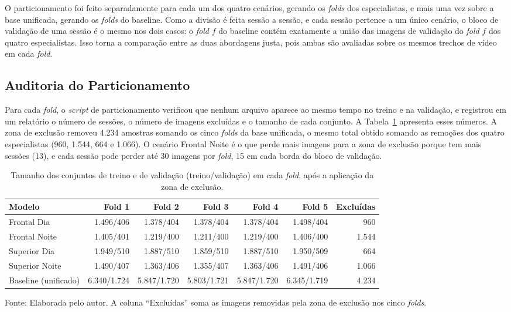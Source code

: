 O particionamento foi feito separadamente para cada um dos quatro cenários, gerando os \textit{folds} dos especialistas, e mais uma vez sobre a base unificada, gerando os \textit{folds} do baseline. Como a divisão é feita sessão a sessão, e cada sessão pertence a um único cenário, o bloco de validação de uma sessão é o mesmo nos dois casos: o \textit{fold} $f$ do baseline contém exatamente a união das imagens de validação do \textit{fold} $f$ dos quatro especialistas. Isso torna a comparação entre as duas abordagens justa, pois ambas são avaliadas sobre os mesmos trechos de vídeo em cada \textit{fold}.

\subsection{Auditoria do Particionamento}
\label{subsec:auditoria}

Para cada \textit{fold}, o \textit{script} de particionamento verificou que nenhum arquivo aparece ao mesmo tempo no treino e na validação, e registrou em um relatório o número de sessões, o número de imagens excluídas e o tamanho de cada conjunto. A Tabela~\ref{tab:auditoria-folds} apresenta esses números. A zona de exclusão removeu 4.234 amostras somando os cinco \textit{folds} da base unificada, o mesmo total obtido somando as remoções dos quatro especialistas (960, 1.544, 664 e 1.066). O cenário Frontal Noite é o que perde mais imagens para a zona de exclusão porque tem mais sessões (13), e cada sessão pode perder até 30 imagens por \textit{fold}, 15 em cada borda do bloco de validação.

\begin{table}[htb]
\centering
\caption{Tamanho dos conjuntos de treino e de validação (treino/validação) em cada \textit{fold}, após a aplicação da zona de exclusão.}
\label{tab:auditoria-folds}
\footnotesize
\setlength{\tabcolsep}{4pt}
\begin{tabular}{lrrrrrr}
\hline
\textbf{Modelo} & \textbf{Fold 1} & \textbf{Fold 2} & \textbf{Fold 3} & \textbf{Fold 4} & \textbf{Fold 5} & \textbf{Excluídas} \\
\hline
Frontal Dia & 1.496/406 & 1.378/404 & 1.378/404 & 1.378/404 & 1.498/404 & 960 \\
Frontal Noite & 1.405/401 & 1.219/400 & 1.211/400 & 1.219/400 & 1.406/400 & 1.544 \\
Superior Dia & 1.949/510 & 1.887/510 & 1.859/510 & 1.887/510 & 1.950/509 & 664 \\
Superior Noite & 1.490/407 & 1.363/406 & 1.355/407 & 1.363/406 & 1.491/406 & 1.066 \\
\hline
Baseline (unificado) & 6.340/1.724 & 5.847/1.720 & 5.803/1.721 & 5.847/1.720 & 6.345/1.719 & 4.234 \\
\hline
\end{tabular}

\vspace{0.2cm}
\normalsize
Fonte: Elaborada pelo autor. A coluna ``Excluídas'' soma as imagens removidas pela zona de exclusão nos cinco \textit{folds}.
\end{table}

